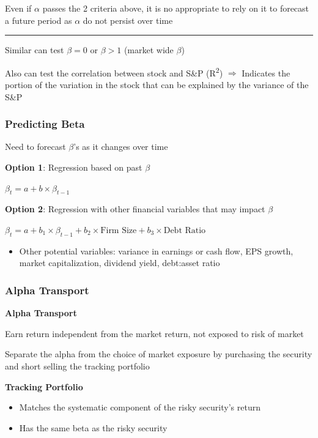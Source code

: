 \documentclass[]{book}
\providecommand{\tightlist}{%
  \setlength{\itemsep}{0pt}\setlength{\parskip}{0pt}}
\theoremstyle{definition}
\theoremstyle{definition}
\theoremstyle{remark}
\begin{document}
Even if \(\alpha\) passes the 2 criteria above, it is no appropriate to
rely on it to forecast a future period as \(\alpha\) do not persist over
time

\begin{center}\rule{0.5\linewidth}{\linethickness}\end{center}

Similar can test \(\beta =0\) or \(\beta > 1\) (market wide \(\beta\))

Also can test the correlation between stock and S\&P
(R\textsuperscript{2}) \(\Rightarrow\) Indicates the portion of the
variation in the stock that can be explained by the variance of the S\&P

\subsubsection{Predicting Beta}\label{predicting-beta}

Need to forecast \(\beta\)'s as it changes over time

\textbf{Option 1}: Regression based on past \(\beta\)

\(\beta_t = a + b \times \beta_{t-1}\)

\textbf{Option 2}: Regression with other financial variables that may
impact \(\beta\)

\(\beta_t = a + b_1 \times \beta_{t-1} + b_2 \times \text{Firm Size} + b_3 \times \text{Debt Ratio}\)

\begin{itemize}
\tightlist
\item
  Other potential variables: variance in earnings or cash flow, EPS
  growth, market capitalization, dividend yield, debt:asset ratio
\end{itemize}

\subsubsection{Alpha Transport}\label{alpha-transport}

 \textbf{Alpha Transport}

Earn return independent from the market return, not exposed to risk of
market

Separate the alpha from the choice of market exposure by purchasing the
security and short selling the tracking portfolio

\textbf{Tracking Portfolio}

\begin{itemize}
\item
  Matches the systematic component of the risky security's return
\item
  Has the same beta as the risky security
\end{itemize}
\end{document}
